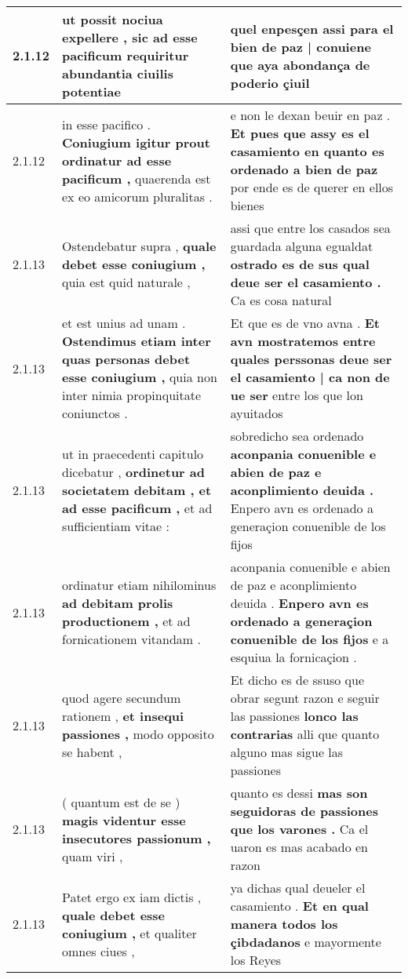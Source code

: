 \begin{tabular}{|p{1cm}|p{6.5cm}|p{6.5cm}|}
2.1.12 & ut possit nociua expellere , \textbf{ sic ad esse pacificum requiritur } abundantia ciuilis potentiae & quel enpesçen \textbf{ assi para el bien de paz | conuiene } que aya abondança de poderio çiuil \\\hline
2.1.12 & in esse pacifico . \textbf{ Coniugium igitur prout ordinatur ad esse pacificum , } quaerenda est ex eo amicorum pluralitas . & e non le dexan beuir en paz . \textbf{ Et pues que assy es el casamiento en quanto es ordenado a bien de paz } por ende es de querer en ellos bienes \\\hline
2.1.13 & Ostendebatur supra , \textbf{ quale debet esse coniugium , } quia est quid naturale , & assi que entre los casados sea guardada alguna egualdat \textbf{ ostrado es de sus qual deue ser el casamiento . } Ca es cosa natural \\\hline
2.1.13 & et est unius ad unam . \textbf{ Ostendimus etiam inter quas personas debet esse coniugium , } quia non inter nimia propinquitate coniunctos . & Et que es de vno avna . \textbf{ Et avn mostratemos entre quales perssonas deue ser el casamiento | ca non de ue ser } entre los que lon ayuitados \\\hline
2.1.13 & ut in praecedenti capitulo dicebatur , \textbf{ ordinetur ad societatem debitam , et ad esse pacificum , } et ad sufficientiam vitae : & sobredicho sea ordenado \textbf{ aconpania conuenible e abien de paz e aconplimiento deuida . } Enpero avn es ordenado a generaçion conuenible de los fijos \\\hline
2.1.13 & ordinatur etiam nihilominus \textbf{ ad debitam prolis productionem , } et ad fornicationem vitandam . & aconpania conuenible e abien de paz e aconplimiento deuida . \textbf{ Enpero avn es ordenado a generaçion conuenible de los fijos } e a esquiua la fornicaçion . \\\hline
2.1.13 & quod agere secundum rationem , \textbf{ et insequi passiones , } modo opposito se habent , & Et dicho es de ssuso que obrar segunt razon e seguir las passiones \textbf{ lonco las contrarias } alli que quanto alguno mas sigue las passiones \\\hline
2.1.13 & ( quantum est de se ) \textbf{ magis videntur esse insecutores passionum , } quam viri , & quanto es dessi \textbf{ mas son seguidoras de passiones que los varones . } Ca el uaron es mas acabado en razon \\\hline
2.1.13 & Patet ergo ex iam dictis , \textbf{ quale debet esse coniugium , } et qualiter omnes ciues , & ya dichas qual deueler el casamiento . \textbf{ Et en qual manera todos los çibdadanos } e mayormente los Reyes \\\hline

\end{tabular}
